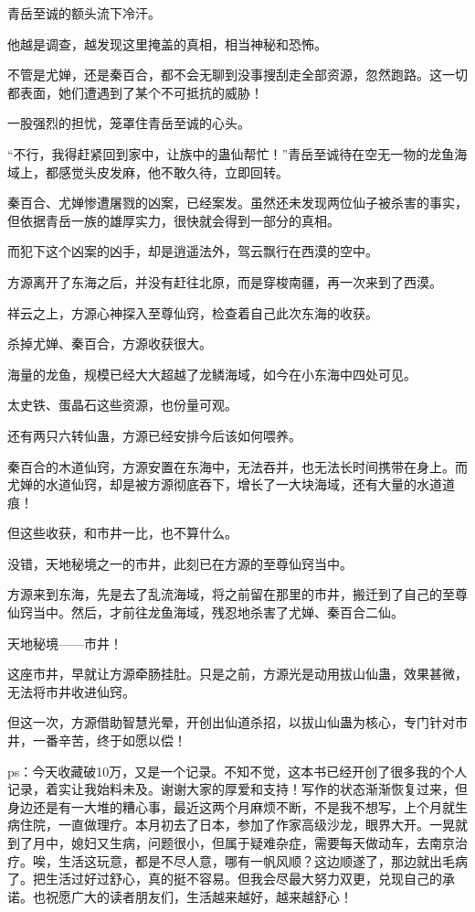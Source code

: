 \begin{this_body}
青岳至诚的额头流下冷汗。

他越是调查，越发现这里掩盖的真相，相当神秘和恐怖。

不管是尤婵，还是秦百合，都不会无聊到没事搜刮走全部资源，忽然跑路。这一切都表面，她们遭遇到了某个不可抵抗的威胁！

一股强烈的担忧，笼罩住青岳至诚的心头。

“不行，我得赶紧回到家中，让族中的蛊仙帮忙！”青岳至诚待在空无一物的龙鱼海域上，都感觉头皮发麻，他不敢久待，立即回转。

秦百合、尤婵惨遭屠戮的凶案，已经案发。虽然还未发现两位仙子被杀害的事实，但依据青岳一族的雄厚实力，很快就会得到一部分的真相。

而犯下这个凶案的凶手，却是逍遥法外，驾云飘行在西漠的空中。

方源离开了东海之后，并没有赶往北原，而是穿梭南疆，再一次来到了西漠。

祥云之上，方源心神探入至尊仙窍，检查着自己此次东海的收获。

杀掉尤婵、秦百合，方源收获很大。

海量的龙鱼，规模已经大大超越了龙鳞海域，如今在小东海中四处可见。

太史铁、蛋晶石这些资源，也份量可观。

还有两只六转仙蛊，方源已经安排今后该如何喂养。

秦百合的木道仙窍，方源安置在东海中，无法吞并，也无法长时间携带在身上。而尤婵的水道仙窍，却是被方源彻底吞下，增长了一大块海域，还有大量的水道道痕！

但这些收获，和市井一比，也不算什么。

没错，天地秘境之一的市井，此刻已在方源的至尊仙窍当中。

方源来到东海，先是去了乱流海域，将之前留在那里的市井，搬迁到了自己的至尊仙窍当中。然后，才前往龙鱼海域，残忍地杀害了尤婵、秦百合二仙。

天地秘境——市井！

这座市井，早就让方源牵肠挂肚。只是之前，方源光是动用拔山仙蛊，效果甚微，无法将市井收进仙窍。

但这一次，方源借助智慧光晕，开创出仙道杀招，以拔山仙蛊为核心，专门针对市井，一番辛苦，终于如愿以偿！

ps：今天收藏破10万，又是一个记录。不知不觉，这本书已经开创了很多我的个人记录，着实让我始料未及。谢谢大家的厚爱和支持！写作的状态渐渐恢复过来，但身边还是有一大堆的糟心事，最近这两个月麻烦不断，不是我不想写，上个月就生病住院，一直做理疗。本月初去了日本，参加了作家高级沙龙，眼界大开。一晃就到了月中，媳妇又生病，问题很小，但属于疑难杂症，需要每天做动车，去南京治疗。唉，生活这玩意，都是不尽人意，哪有一帆风顺？这边顺遂了，那边就出毛病了。把生活过好过舒心，真的挺不容易。但我会尽最大努力双更，兑现自己的承诺。也祝愿广大的读者朋友们，生活越来越好，越来越舒心！

\end{this_body}

